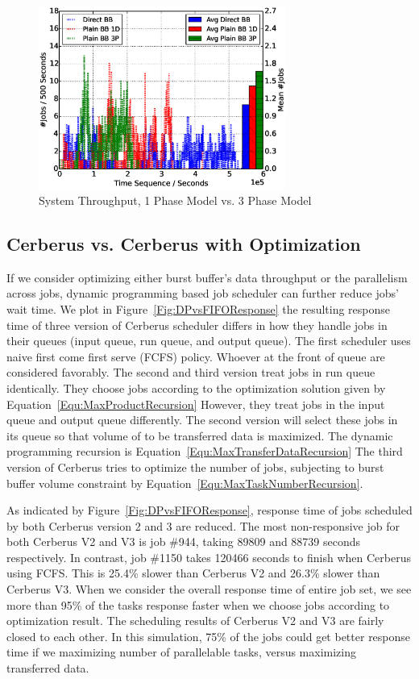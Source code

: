 \begin{figure}[!t]
        \centering
        \includegraphics[width=3.2in]{Draw3Pvs1P/1000jobs_3p_vs_1p_throughput}
        \caption{System Throughput, 1 Phase Model vs. 3 Phase Model}
        \label{Fig:3Pvs1PThroughput}
\end{figure}



\subsection{Cerberus vs. Cerberus with Optimization}
If we consider optimizing either burst buffer's data throughput or the parallelism across jobs,
dynamic programming based job scheduler can further reduce jobs' wait time.
We plot in Figure~\ref{Fig:DPvsFIFOResponse} the resulting response time of
three version of Cerberus scheduler differs in
how they handle jobs in their queues (input queue, run queue, and output queue).
The first scheduler uses naive first come first serve (FCFS) policy.
Whoever at the front of queue are considered favorably.
The second and third version treat jobs in run queue identically.
They choose jobs according to the optimization solution given by Equation~\ref{Equ:MaxProductRecursion}
However, they treat jobs in the input queue and output queue differently.
The second version will select these jobs in its queue so that
volume of to be transferred data is maximized.
The dynamic programming recursion is Equation~\ref{Equ:MaxTransferDataRecursion}
The third version of Cerberus tries to optimize the number of jobs,
subjecting to burst buffer volume constraint by Equation~\ref{Equ:MaxTaskNumberRecursion}.

As indicated by Figure~\ref{Fig:DPvsFIFOResponse}, response time of
jobs scheduled by both Cerberus version 2 and 3 are reduced.
The most non-responsive job for both Cerberus V2 and V3 is job \#944,
taking 89809 and 88739 seconds respectively.
In contrast, job \#1150 takes 120466 seconds to finish when Cerberus using FCFS.
This is 25.4\% slower than Cerberus V2 and 26.3\% slower than Cerberus V3.
When we consider the overall response time of entire job set,
we see more than 95\% of the tasks response faster when we choose jobs according to
optimization result.
The scheduling results of Cerberus V2 and V3 are fairly closed to each other.
In this simulation, 75\% of the jobs could get better response time
if we maximizing number of parallelable tasks,
versus maximizing transferred data.

